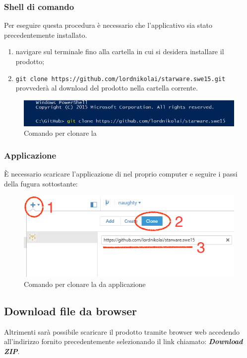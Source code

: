 \documentclass[12pt,a4paper]{article}
\begin{document}
	\subsubsection{Shell di comando} 
	Per eseguire questa procedura è necessario che l'applicativo  sia stato precedentemente installato.
	\begin{enumerate}
		\item navigare sul terminale fino alla cartella in cui si desidera installare il prodotto;
		\item \texttt{git clone https://github.com/lordnikolai/starware.swe15.git} provvederà al download del prodotto nella cartella corrente. 
	\end{enumerate}
	
		\begin{figure}[H]	
			\centering
			\includegraphics[width=1.0\linewidth]{../img/manualeInstallazione/gitShell.png}
			\caption{Comando per clonare la }
			\label{Comando per clonare la repository}
		\end{figure}
	\subsubsection{Applicazione}
	È necessario scaricare l'applicazione di  nel proprio computer e seguire i passi della fugura sottostante:
	
	\begin{figure}[H]	
		\centering
		\includegraphics[width=1.0\linewidth]{../img/manualeInstallazione/gitHubTool.png}
		\caption{Comando per clonare la  da applicazione}
		\label{Comando per clonare la repository da applicazione}
	\end{figure}
	
	\subsection{Download file da browser}
	Altrimenti sarà possibile scaricare il prodotto tramite browser web accedendo
	all’indirizzo fornito precedentemente selezionando il link chiamato: \textbf{\textit{Download ZIP}}.
	
\end{document}
